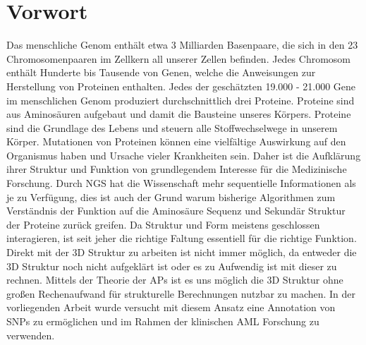 \chapter{Vorwort}

Das menschliche Genom enthält etwa 3 Milliarden Basenpaare, die sich in den 23 Chromosomenpaaren im Zellkern all unserer Zellen befinden. Jedes Chromosom enthält Hunderte bis Tausende von Genen, welche die Anweisungen zur Herstellung von Proteinen enthalten. Jedes der geschätzten 19.000 - 21.000 Gene\cite{Ezkurdia.2014} im menschlichen Genom produziert durchschnittlich drei Proteine. Proteine sind aus Aminosäuren aufgebaut und damit die Bausteine unseres Körpers. Proteine sind die Grundlage des Lebens und steuern alle Stoffwechselwege in unserem Körper. Mutationen von Proteinen können eine vielfältige Auswirkung auf den Organismus haben und Ursache vieler Krankheiten sein. Daher ist die Aufklärung ihrer Struktur und Funktion von grundlegendem Interesse für die Medizinische Forschung. 
Durch \ac{NGS} hat die Wissenschaft mehr sequentielle Informationen als je zu Verfügung, dies ist auch der Grund warum bisherige Algorithmen zum Verständnis der Funktion auf die Aminosäure Sequenz und Sekundär Struktur der Proteine zurück greifen. Da Struktur und Form meistens geschlossen interagieren, ist seit jeher die richtige Faltung essentiell für die richtige Funktion. Direkt mit der 3D Struktur zu arbeiten ist nicht immer möglich, da entweder die 3D Struktur noch nicht aufgeklärt ist oder es zu Aufwendig ist mit dieser zu rechnen.
Mittels der Theorie der \ac{APs} ist es uns möglich die 3D Struktur ohne großen Rechenaufwand für strukturelle Berechnungen nutzbar zu machen. In der vorliegenden Arbeit wurde versucht mit diesem Ansatz eine Annotation von \ac{SNP}s zu ermöglichen und im Rahmen der klinischen \ac{AML} Forschung zu verwenden.

